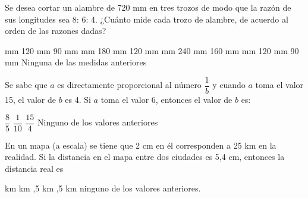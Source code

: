 \documentclass[pagina vacia]{srs}
\begin{document}
\begin{preguntas}
\pregunta Se desea cortar un alambre de 720 mm en tres trozos de modo que la razón de sus
longitudes sea 8: 6: 4. ¿Cuánto mide cada trozo de alambre, de acuerdo al orden de
las razones dadas?
\begin{vertical}
 mm \hspace*{10pt} 120 mm \hspace*{10pt} 90 mm
 mm \hspace*{10pt} 180 mm \hspace*{10pt} 120 mm
 mm \hspace*{10pt} 240 mm \hspace*{10pt} 160 mm
 mm \hspace*{10pt} 120 mm \hspace*{10pt} 90 mm
\alternativa Ninguna de las medidas anteriores
\end{vertical}

\pregunta Se sabe que $a$ es directamente proporcional al número $\dfrac{1}{b}$ y cuando
$a$ toma el valor 15, el valor de $b$ es 4. Si $a$ toma el valor 6, entonces
el valor de $b$ es:
\begin{vertical}
\alternativa $\dfrac{8}{5}$
\alternativa $\dfrac{1}{10}$
\alternativa $\dfrac{15}{4}$
\alternativa Ninguno de los valores anteriores
\end{vertical}

\pregunta En un mapa (a escala) se tiene que 2 cm en él corresponden a 25 km en la realidad.
Si la distancia en el mapa entre dos ciudades es 5,4 cm, entonces la distancia real es
\begin{vertical}
 km
 km
,5 km
,5 km
\alternativa ninguno de los valores anteriores.
\end{vertical}


\end{preguntas}
\end{document}
